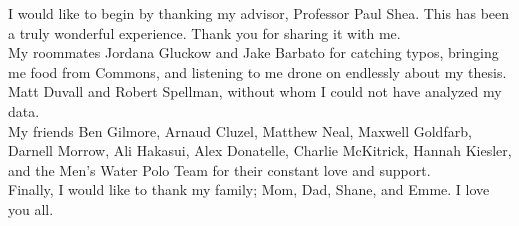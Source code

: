 I would like to begin by thanking my advisor, Professor Paul Shea. This has been a truly wonderful experience. Thank you for sharing it with me.\\

My roommates Jordana Gluckow and Jake Barbato for catching typos, bringing me food from Commons, and listening to me drone on endlessly about my thesis.\\

Matt Duvall and Robert Spellman, without whom I could not have analyzed my data.\\

My friends Ben Gilmore, Arnaud Cluzel, Matthew Neal, Maxwell Goldfarb, Darnell Morrow, Ali Hakasui, Alex Donatelle, Charlie McKitrick, Hannah Kiesler, and the Men's Water Polo Team for their constant love and support.\\

Finally, I would like to thank my family; Mom, Dad, Shane, and Emme. I love you all. 